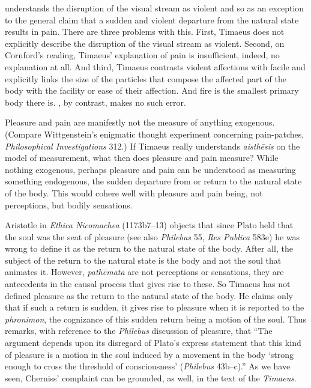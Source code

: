 \citet[269]{Cornford:1935fk} understands the disruption of the visual stream as violent and so as an exception to the general claim that a sudden and violent departure from the natural state results in pain. There are three problems with this. First, Timaeus does not explicitly describe the disruption of the visual stream as violent. Second, on Cornford's reading, Timaeus' explanation of pain is insufficient, indeed, no explanation at all. And third, Timaeus contrasts violent affections with facile and explicitly links the size of the particles that compose the affected part of the body with the facility or ease of their affection. And fire is the smallest primary body there is. \citet[447]{Taylor:1928qb}, by contrast, makes no such error.

Pleasure and pain are manifestly not the measure of anything exogenous. (Compare Wittgenstein's enigmatic thought experiment concerning pain-patches, \emph{Philosophical Investigations} 312.) If Timaeus really understands \emph{aisthēsis} on the model of measurement, what then does pleasure and pain measure? While nothing exogenous, perhaps pleasure and pain can be understood as measuring something endogenous, the sudden departure from or return to the natural state of the body. This would cohere well with pleasure and pain being, not perceptions, but bodily sensations.

Aristotle in \emph{Ethica Nicomachea} (1173b7--13) objects that since Plato held that the soul was the seat of pleasure (see also \emph{Philebus} 55, \emph{Res Publica} 583e) he was wrong to define it as the return to the natural state of the body. After all, the subject of the return to the natural state is the body and not the soul that animates it. However, \emph{pathēmata} are not perceptions or sensations, they are antecedents in the causal process that gives rise to these. So Timaeus has not defined pleasure as the return to the natural state of the body. He claims only that if such a return is sudden, it gives rise to pleasure when it is reported to the \emph{phronimon}, the cognizance of this sudden return being a motion of the soul. Thus \citet[403 n328]{Cherniss:1944aa} remarks, with reference to the \emph{Philebus} discussion of pleasure, that ``The argument depends upon its disregard of Plato's express statement that this kind of pleasure is a motion in the soul induced by a movement in the body `strong enough to cross the threshold of consciousness' (\emph{Philebus} 43b--c).'' As we have seen, Cherniss' complaint can be grounded, as well, in the text of the \emph{Timaeus}.

